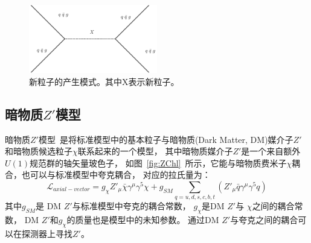 \begin{figure}
  \begin{center}
    \includegraphics[width=0.5\textwidth]{figuresTHE/SChl.pdf}
  \end{center}
  \caption{
新粒子的产生模式。其中X表示新粒子。
}
    \label{fig:BSMDijet1}
\end{figure}






\subsection{暗物质$Z'$模型}
\label{sec:ZPrime}

暗物质$Z'$模型~\cite{DM1,DM2,DM3}是将标准模型中的基本粒子与暗物质(Dark Matter, DM)媒介子$Z'$和暗物质候选粒子$\chi$联系起来的一个模型，
其中暗物质媒介子$Z'$是一个来自额外$U(1)$规范群的轴矢量玻色子，
如图~\ref{fig:ZChl}~所示，它能与暗物质费米子$\chi$耦合，也可以与标准模型中夸克耦合，
对应的拉氏量为：
\begin{equation} 
\label{eq:ZPrime1}
\mathcal{L}_{axial-vector}=g_{\chi} Z'_{\mu} \bar{\chi} \gamma^{\mu} \gamma^5 \chi +
g_{SM} \sum_{q=u,d,s,c,b,t} \left( Z'_{\mu} \bar{q} \gamma^{\mu} \gamma^5 q \right)
\end{equation}
其中$g_{SM}$是
DM $Z'$与标准模型中夸克的耦合常数，
$g_{\chi}$是DM $Z'$与
$\chi$之间的耦合常数，
DM $Z'$和$g_{\chi}$的质量也是模型中的未知参数。
通过DM $Z'$与夸克之间的耦合可以在探测器上寻找$Z'$。

